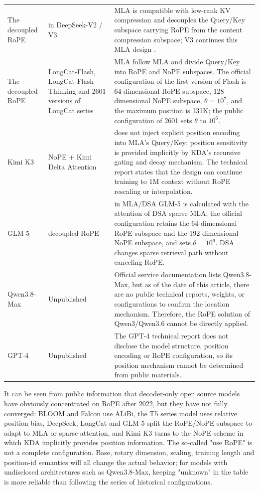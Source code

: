 \documentclass[UTF8,fontset=none,a4paper,10pt]{ctexart}
\begin{document}
\begin{longtable}{@{}p{2.7cm}p{3.6cm}p{8.0cm}@{}}
The decoupled RoPE & in DeepSeek-V2 / V3 & MLA is compatible with low-rank KV compression and decouples the Query/Key subspace carrying RoPE from the content compression subspace; V3 continues this MLA design \cite{en:deepseek2024v2,en:deepseek2024v3}. \\

The decoupled RoPE & LongCat-Flash, LongCat-Flash-Thinking and 2601 versions of LongCat series & MLA follow MLA and divide Query/Key into RoPE and NoPE subspaces. The official configuration of the first version of Flash is 64-dimensional RoPE subspace, 128-dimensional NoPE subspace, $\theta=10^7$, and the maximum position is 131K; the public configuration of 2601 sets $\theta$ to $10^6$\cite{en:longcatflash,en:longcatthinking2601,en:longcatconfigs}. \\

Kimi K3 & NoPE + Kimi Delta Attention & does not inject explicit position encoding into MLA's Query/Key; position sensitivity is provided implicitly by KDA's recursive gating and decay mechanism. The technical report states that the design can continue training to 1M context \cite{en:kimik3} without RoPE rescaling or interpolation. \\

GLM-5 & decoupled RoPE & in MLA/DSA GLM-5 is calculated with the attention of DSA sparse MLA; the official configuration retains the 64-dimensional RoPE subspace and the 192-dimensional NoPE subspace, and sets $\theta=10^6$. DSA changes sparse retrieval path without canceling RoPE\cite{en:glm5,en:glm5config}. \\

Qwen3.8-Max & Unpublished & Official service documentation lists Qwen3.8-Max, but as of the date of this article, there are no public technical reports, weights, or configurations to confirm the location mechanism. Therefore, the RoPE solution \cite{en:qwen38docs} of Qwen3/Qwen3.6 cannot be directly applied. \\

GPT-4 & Unpublished & The GPT-4 technical report does not disclose the model structure, position encoding or RoPE configuration, so its position mechanism \cite{en:openai2023gpt4} cannot be determined from public materials. \\

\end{longtable}

It can be seen from public information that decoder-only open source models have obviously concentrated on RoPE after 2022, but they have not fully converged: BLOOM and Falcon use ALiBi, the T5 series model uses relative position bias, DeepSeek, LongCat and GLM-5 split the RoPE/NoPE subspace to adapt to MLA or sparse attention, and Kimi K3 turns to the NoPE scheme in which KDA implicitly provides position information. The so-called "use RoPE" is not a complete configuration. Base, rotary dimension, scaling, training length and position-id semantics will all change the actual behavior; for models with undisclosed architectures such as Qwen3.8-Max, keeping "unknown" in the table is more reliable than following the series of historical configurations.
\end{document}
